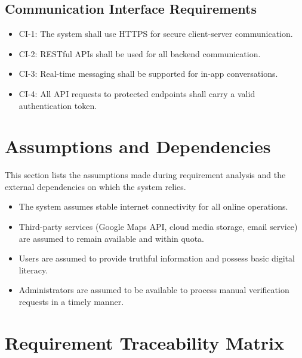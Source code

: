 \subsection{Communication Interface Requirements}

\begin{itemize}
\item CI-1: The system shall use HTTPS for secure client-server communication.
\item CI-2: RESTful APIs shall be used for all backend communication.
\item CI-3: Real-time messaging shall be supported for in-app conversations.
\item CI-4: All API requests to protected endpoints shall carry a valid authentication token.
\end{itemize}

\section{Assumptions and Dependencies}

This section lists the assumptions made during requirement analysis and the external dependencies on which the system relies.

\begin{itemize}
\item The system assumes stable internet connectivity for all online operations.
\item Third-party services (Google Maps API, cloud media storage, email service) are assumed to remain available and within quota.
\item Users are assumed to provide truthful information and possess basic digital literacy.
\item Administrators are assumed to be available to process manual verification requests in a timely manner.
\end{itemize}

\section{Requirement Traceability Matrix}

